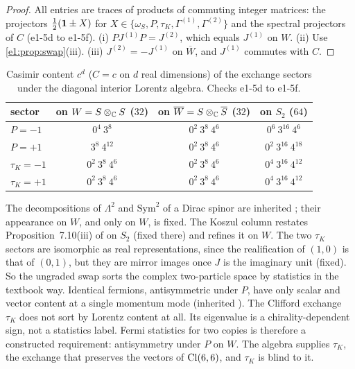 \begin{proof}
All entries are traces of products of commuting integer matrices: the projectors $\tfrac12(\mathbf 1\pm X)$ for $X\in\{\omega_S,P,\tau_K,\Gamma^{(1)},\Gamma^{(2)}\}$ and
the spectral projectors of $C$ (e1-5d to e1-5f). (i) $PJ^{(1)}P=J^{(2)}$, which equals $J^{(1)}$ on $W$. (ii) Use \cref{e1:prop:swap}(iii). (iii)
$J^{(2)}=-J^{(1)}$ on $\overline W$, and $J^{(1)}$ commutes with $C$.
\end{proof}

\begin{table}[t]
\centering
\small
\begin{tabular}{@{}lccc@{}}
\toprule
sector & on $W=S\otimes_{\mathbb{C}} S$ ($32$) & on $\overline W=S\otimes_{\mathbb{C}}\overline S$ ($32$) & on $S_2$ ($64$)\\
\midrule
$P=-1$ & $0^4\ 3^8$ & $0^2\ 3^8\ 4^6$ & $0^6\ 3^{16}\ 4^6$\\
$P=+1$ & $3^8\ 4^{12}$ & $0^2\ 3^8\ 4^6$ & $0^2\ 3^{16}\ 4^{18}$\\
$\tau_K=-1$ & $0^2\ 3^8\ 4^6$ & $0^2\ 3^8\ 4^6$ & $0^4\ 3^{16}\ 4^{12}$\\
$\tau_K=+1$ & $0^2\ 3^8\ 4^6$ & $0^2\ 3^8\ 4^6$ & $0^4\ 3^{16}\ 4^{12}$\\
\bottomrule
\end{tabular}
\caption{Casimir content $c^d$ ($C=c$ on $d$ real dimensions) of the exchange sectors under the diagonal interior Lorentz algebra.
Checks e1-5d to e1-5f.}
\label{e1:tab:stat}
\end{table}

The decompositions of $\Lambda^2$ and $\mathrm{Sym}^2$ of a Dirac spinor are inherited \cite{WeinbergQFT}; their appearance on $W$, and only on $W$,
is fixed. The Koszul column restates Proposition~7.10(iii) of \cite{RE} on $S_2$ (fixed there) and refines it on $W$. The two $\tau_K$
sectors are isomorphic as real representations, since the realification of $(1,0)$ is that of $(0,1)$, but they are mirror images once $J$ is
the imaginary unit (fixed). So the ungraded swap sorts the complex two-particle space by statistics in the textbook way. Identical fermions,
antisymmetric under $P$, have only scalar and vector content at a single momentum mode (inherited \cite{Pauli40}). The Clifford exchange
$\tau_K$ does not sort by Lorentz content at all. Its eigenvalue is a chirality-dependent sign, not a statistics label. Fermi statistics
for two copies is therefore a constructed requirement: antisymmetry under $P$ on $W$. The algebra supplies $\tau_K$, the exchange that
preserves the vectors of $\mathrm{Cl}(6,6)$, and $\tau_K$ is blind to it.

